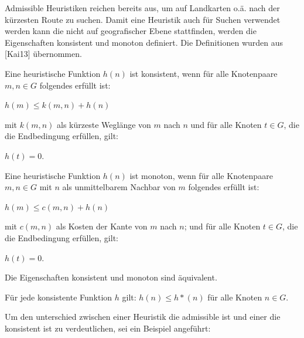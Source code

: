 Admissible Heuristiken reichen bereits aus, um auf Landkarten o.\"a. nach der k\"urzesten Route zu suchen. Damit eine Heuristik auch f\"ur Suchen verwendet werden kann die nicht auf geografischer Ebene stattfinden, werden die Eigenschaften konsistent und monoton definiert. Die Definitionen wurden aus [Kai13] \"ubernommen. 

\begin{defi}
Eine heuristische Funktion $h(n)$ ist konsistent, wenn f\"ur alle Knotenpaare $m, n \in G$ folgendes erf\"ullt ist: 
\begin{center}
$h(m) \leq k(m, n) + h(n)$
\end{center}
mit $k(m, n)$ als k\"urzeste Wegl\"ange von $m$ nach $n$ und f\"ur alle Knoten $t \in G$, die die Endbedingung erf\"ullen, gilt: 
\begin{center}
$h(t)=0$.
\end{center}
\end{defi}

\begin{defi}
Eine heuristische Funktion $h(n)$ ist monoton, wenn f\"ur alle Knotenpaare $m, n \in G$ mit $n$ als unmittelbarem Nachbar von $m$ folgendes erf\"ullt ist: 
\begin{center}
$h(m) \leq c(m, n) + h(n)$
\end{center}
mit $c(m, n)$ als Kosten der Kante von $m$ nach $n$; und f\"ur alle Knoten $t \in G$, die die Endbedingung erf\"ullen, gilt: 
\begin{center}
$h(t)=0$.
\end{center}
\end{defi}

\begin{theore}
Die Eigenschaften konsistent und monoton sind \"aquivalent.
\end{theore}

\begin{theore}
F\"ur jede konsistente Funktion $h$ gilt:
$h(n) \leq h*(n)$ f\"ur alle Knoten $n \in G$.
\end{theore}

Um den unterschied zwischen einer Heuristik die admissible ist und einer die konsistent ist zu verdeutlichen, sei ein Beispiel angef\"uhrt: 


